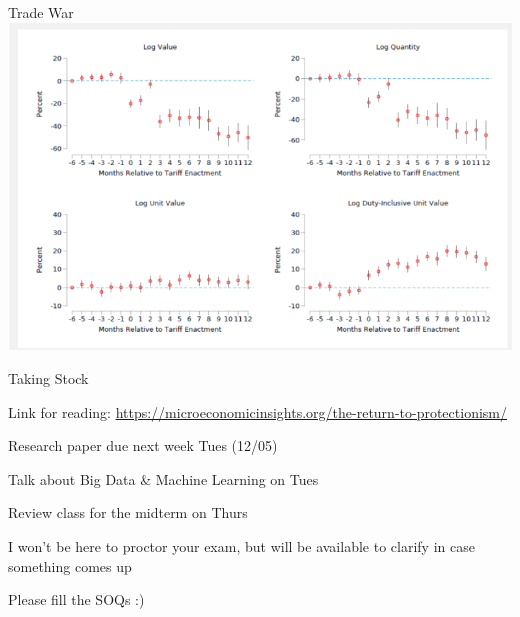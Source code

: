\documentclass{./../div_teaching_slides}
\begin{document}
\begin{frame}{Trade War}
\centering
\includegraphics[scale=0.4]{eg2_2.png}
\end{frame}


\begin{frame}{Taking Stock}
\begin{witemize}
 \item Link for reading: \href{https://microeconomicinsights.org/the-return-to-protectionism/}{https://microeconomicinsights.org/the-return-to-protectionism/}
  \item Research paper due next week Tues (12/05)
  \item Talk about Big Data \& Machine Learning on Tues
  \item Review class for the midterm on Thurs
  \item I won't be here to proctor your exam, but will be available to clarify in case something comes up
  \item Please fill the SOQs :)
\end{witemize}

\end{frame}
\end{document}
